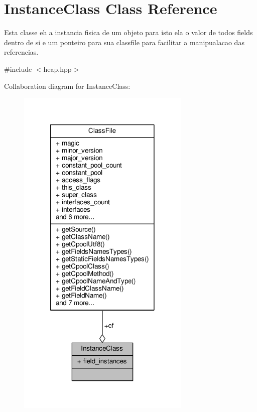 \hypertarget{classInstanceClass}{\section{Instance\+Class Class Reference}
\label{classInstanceClass}
}


Esta classe eh a instancia fisica de um objeto para isto ela o valor de todos fields dentro de si e um ponteiro para sua classfile para facilitar a manipualacao das referencias.  




{\ttfamily \#include $<$heap.\+hpp$>$}



Collaboration diagram for Instance\+Class\+:\nopagebreak
\begin{figure}[H]
\begin{center}
\leavevmode
\includegraphics[width=234pt]{classInstanceClass__coll__graph}
\end{center}
\end{figure}
